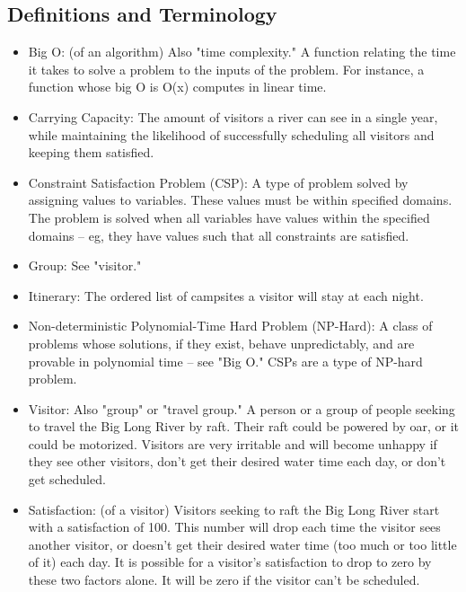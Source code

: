 \documentclass[11pt]{article} %
\begin{document}
\subsection{Definitions and Terminology}
\label{sec:defs}
\begin{itemize}
\item Big O: (of an algorithm) Also "time complexity." A function relating the
time it takes to solve a problem to the inputs of the problem. For instance,
a function whose big O is O(x) computes in linear time.

\item Carrying Capacity: The amount of visitors a river can see in a single
year, while maintaining the likelihood of successfully scheduling all
visitors and keeping them satisfied.

\item Constraint Satisfaction Problem (CSP): A type of problem solved by
assigning values to variables. These values must be within specified domains.
The problem is solved when all variables have values within the specified
domains -- eg, they have values such that all constraints are satisfied.

\item Group: See "visitor."

\item Itinerary: The ordered list of campsites a visitor will stay at each
night.

\item Non-deterministic Polynomial-Time Hard Problem (NP-Hard): A class of
problems whose solutions, if they exist, behave unpredictably, and are
provable in polynomial time -- see "Big O." CSPs
are a type of NP-hard problem.

\item Visitor: Also "group" or "travel group." A person or a group of people
seeking to travel the Big Long River by raft. Their raft could be powered
by oar, or it could be motorized. Visitors are very irritable and will
become unhappy if they see other visitors, don't get their desired water
time each day, or don't get scheduled.

\item Satisfaction: (of a visitor) Visitors seeking to raft the Big Long River
start with a satisfaction of 100. This number will drop each time the visitor
sees another visitor, or doesn't get their desired water time (too much or
too little of it) each day. It is possible for a visitor's satisfaction to
drop to zero by these two factors alone. It will be zero if the visitor
can't be scheduled.


\end{itemize}
\end{document}
